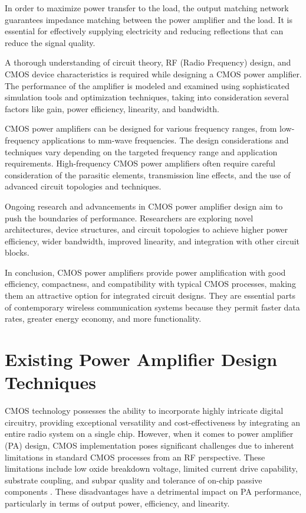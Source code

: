 In order to maximize power transfer to the load, the output matching network guarantees impedance matching between the power amplifier and the load. It is essential for effectively supplying electricity and reducing reflections that can reduce the signal quality.

A thorough understanding of circuit theory, RF (Radio Frequency) design, and CMOS device characteristics is required while designing a CMOS power amplifier. The performance of the amplifier is modeled and examined using sophisticated simulation tools and optimization techniques, taking into consideration several factors like gain, power efficiency, linearity, and bandwidth.

CMOS power amplifiers can be designed for various frequency ranges, from low-frequency applications to mm-wave frequencies. The design considerations and techniques vary depending on the targeted frequency range and application requirements. High-frequency CMOS power amplifiers often require careful consideration of the parasitic elements, transmission line effects, and the use of advanced circuit topologies and techniques.

Ongoing research and advancements in CMOS power amplifier design aim to push the boundaries of performance. Researchers are exploring novel architectures, device structures, and circuit topologies to achieve higher power efficiency, wider bandwidth, improved linearity, and integration with other circuit blocks.

In conclusion, CMOS power amplifiers provide power amplification with good efficiency, compactness, and compatibility with typical CMOS processes, making them an attractive option for integrated circuit designs. They are essential parts of contemporary wireless communication systems because they permit faster data rates, greater energy economy, and more functionality.

\section{Existing Power Amplifier Design Techniques}
 CMOS technology possesses the ability to incorporate highly intricate digital circuitry, providing exceptional versatility and cost-effectiveness by integrating an entire radio system on a single chip. However, when it comes to power amplifier (PA) design, CMOS implementation poses significant challenges due to inherent limitations in standard CMOS processes from an RF perspective. These limitations include low oxide breakdown voltage, limited current drive capability, substrate coupling, and subpar quality and tolerance of on-chip passive components \cite{1320534, 1635249, 1465784}. These disadvantages have a detrimental impact on PA performance, particularly in terms of output power, efficiency, and linearity.
 
